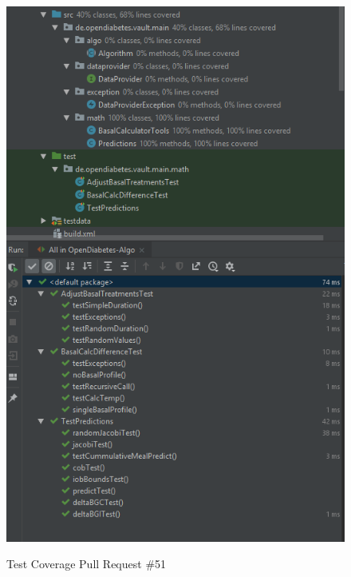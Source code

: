 \documentclass[accentcolor=tud0b,12pt,paper=a4]{tudreport}
\begin{document}
\begin{figure}[h]
\centering
\caption{Test Coverage Pull Request \#51}
\includegraphics[width=\textwidth,height=\textheight,keepaspectratio]{pr-cov-51}
\label{pr-cov:51}
\end{figure}
\end{document}
